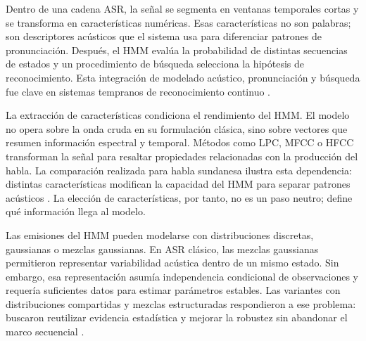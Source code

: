 Dentro de una cadena ASR, la señal se segmenta en ventanas temporales cortas y se transforma en características numéricas. Esas características no son palabras; son descriptores acústicos que el sistema usa para diferenciar patrones de pronunciación. Después, el HMM evalúa la probabilidad de distintas secuencias de estados y un procedimiento de búsqueda selecciona la hipótesis de reconocimiento. Esta integración de modelado acústico, pronunciación y búsqueda fue clave en sistemas tempranos de reconocimiento continuo \cite{Lee1990SpeechRecogn}.

La extracción de características condiciona el rendimiento del HMM. El modelo no opera sobre la onda cruda en su formulación clásica, sino sobre vectores que resumen información espectral y temporal. Métodos como LPC, MFCC o HFCC transforman la señal para resaltar propiedades relacionadas con la producción del habla. La comparación realizada para habla sundanesa ilustra esta dependencia: distintas características modifican la capacidad del HMM para separar patrones acústicos \cite{Yulita2018FeaturExtrac}. La elección de características, por tanto, no es un paso neutro; define qué información llega al modelo.

Las emisiones del HMM pueden modelarse con distribuciones discretas, gaussianas o mezclas gaussianas. En ASR clásico, las mezclas gaussianas permitieron representar variabilidad acústica dentro de un mismo estado. Sin embargo, esa representación asumía independencia condicional de observaciones y requería suficientes datos para estimar parámetros estables. Las variantes con distribuciones compartidas y mezclas estructuradas respondieron a ese problema: buscaron reutilizar evidencia estadística y mejorar la robustez sin abandonar el marco secuencial \cite{MeiYuhHwang1993SharedDistri,Zhao2012StrandGaussi}.

